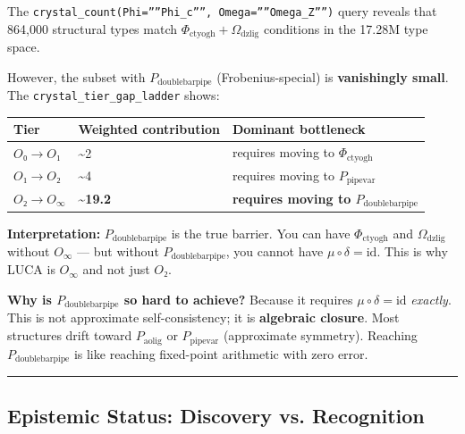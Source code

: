 \documentclass[12pt,a4paper]{article}
\begin{document}
The \texttt{crystal\_count(Phi=''''Phi\_c'''', Omega=''''Omega\_Z'''')} query reveals that 864,000 structural types match $\Phi_{\text{ctyogh}} + \Omega_{\text{dzlig}}$ conditions in the 17.28M type space.

However, the subset with \textbf{$P_{\text{doublebarpipe}}$} (Frobenius-special) is \textbf{vanishingly small}. The \texttt{crystal\_tier\_gap\_ladder} shows:

\begin{table}[htbp]
\centering
\small
{}
\begin{tabularx}{\textwidth}{>{\centering\arraybackslash}X >{\centering\arraybackslash}X >{\centering\arraybackslash}X}
\toprule
\rowcolor{gray!25}\textbf{Tier} & \textbf{Weighted contribution} & \textbf{Dominant bottleneck} \\
\midrule
\rowcolors{1}{white}{gray!10}
$O₀ \to O₁$ & \textasciitilde{}2 & requires moving to $\Phi_{\text{ctyogh}}$ \\
$O₁ \to O₂$ & \textasciitilde{}4 & requires moving to $P_{\text{pipevar}}$ \\
$O₂ \to O_{\infty}$ & \textbf{\textasciitilde{}19.2} & \textbf{requires moving to $P_{\text{doublebarpipe}}$} \\
\bottomrule
\end{tabularx}
\end{table}

\textbf{Interpretation:} $P_{\text{doublebarpipe}}$ is the true barrier. You can have $\Phi_{\text{ctyogh}}$ and $\Omega_{\text{dzlig}}$ without $O_{\infty}$ --- but without $P_{\text{doublebarpipe}}$, you cannot have $\mu \circ \delta = \text{id}$. This is why LUCA is $O_{\infty}$ and not just $O₂$.

\textbf{Why is $P_{\text{doublebarpipe}}$ so hard to achieve?} Because it requires $\mu \circ \delta = \text{id}$ \emph{exactly}. This is not approximate self-consistency; it is \textbf{algebraic closure}. Most structures drift toward $P_{\text{aolig}}$ or $P_{\text{pipevar}}$ (approximate symmetry). Reaching $P_{\text{doublebarpipe}}$ is like reaching fixed-point arithmetic with zero error.

\begin{center}
\rule{0.5\textwidth}{0.4pt}
\end{center}

\subsection{Epistemic Status: Discovery vs. Recognition}
\end{document}

